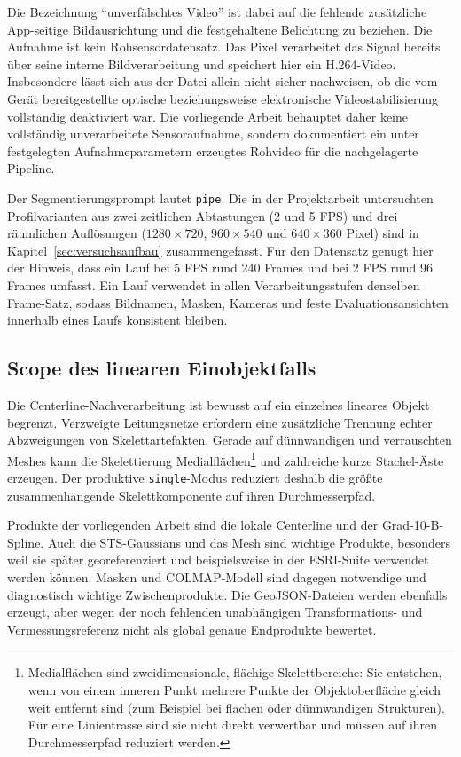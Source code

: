 Die Bezeichnung \enquote{unverfälschtes Video} ist dabei auf die fehlende zusätzliche
App-seitige Bildausrichtung und die festgehaltene Belichtung zu beziehen. Die
Aufnahme ist kein Rohsensordatensatz. Das Pixel verarbeitet das Signal bereits
über seine interne Bildverarbeitung und speichert hier ein H.264-Video.
Insbesondere lässt sich aus der Datei allein nicht sicher nachweisen, ob die
vom Gerät bereitgestellte optische beziehungsweise elektronische
Videostabilisierung vollständig deaktiviert war. Die vorliegende Arbeit behauptet daher keine
vollständig unverarbeitete Sensoraufnahme, sondern dokumentiert ein unter
festgelegten Aufnahmeparametern erzeugtes Rohvideo für die nachgelagerte
Pipeline.

Der Segmentierungsprompt lautet \texttt{pipe}. Die in der Projektarbeit
untersuchten Profilvarianten aus zwei zeitlichen Abtastungen (2 und 5 FPS) und
drei räumlichen Auflösungen ($1280\times720$, $960\times540$ und
$640\times360$ Pixel) sind in Kapitel~\ref{sec:versuchsaufbau} zusammengefasst.
Für den Datensatz genügt hier der Hinweis, dass ein Lauf bei 5 FPS rund 240
Frames und bei 2 FPS rund 96 Frames umfasst. Ein Lauf verwendet in allen
Verarbeitungsstufen denselben Frame-Satz, sodass Bildnamen, Masken, Kameras
und feste Evaluationsansichten innerhalb eines Laufs konsistent bleiben.

\subsection{Scope des linearen Einobjektfalls}

Die Centerline-Nachverarbeitung ist bewusst auf ein einzelnes lineares Objekt
begrenzt. Verzweigte Leitungsnetze erfordern eine zusätzliche Trennung echter
Abzweigungen von Skelettartefakten. Gerade auf dünnwandigen und verrauschten
Meshes kann die Skelettierung Medialflächen\footnote{Medialflächen sind
zweidimensionale, flächige Skelettbereiche: Sie entstehen, wenn von einem
inneren Punkt mehrere Punkte der Objektoberfläche gleich weit entfernt sind
(zum Beispiel bei flachen oder dünnwandigen Strukturen). Für eine
Linientrasse sind sie nicht direkt verwertbar und müssen auf ihren
Durchmesserpfad reduziert werden.\label{fn:medialflaechen}} und zahlreiche
kurze Stachel-Äste erzeugen. Der produktive \texttt{single}-Modus reduziert
deshalb die größte zusammenhängende Skelettkomponente auf ihren
Durchmesserpfad.

Produkte der vorliegenden Arbeit sind die lokale Centerline und der Grad-10-B-Spline. Auch die
STS-Gaussians und das Mesh sind wichtige Produkte, besonders weil sie später
georeferenziert und beispielsweise in der ESRI-Suite verwendet werden können.
Masken und COLMAP-Modell sind dagegen notwendige und diagnostisch wichtige
Zwischenprodukte. Die GeoJSON-Dateien werden ebenfalls erzeugt, aber wegen der
noch fehlenden unabhängigen Transformations- und Vermessungsreferenz nicht als
global genaue Endprodukte bewertet.

